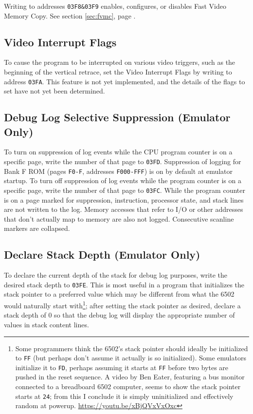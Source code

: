 \documentclass[12pt]{{memoir}}
\begin{document}
Writing to addresses \texttt{03F8\&03F9} enables, configures, or disables Fast Video Memory Copy. See section \ref{sec:fvmc}, page \pageref{sec:fvmc}.

\subsection{Video Interrupt Flags}

To cause the program to be interrupted on various video triggers, such as the beginning of the vertical retrace, set the Video Interrupt Flags by writing to address \texttt{03FA}. This feature is not yet implemented, and the details of the flags to set have not yet been determined.

\subsection{Debug Log Selective Suppression (Emulator Only)}

To turn on suppression of log events while the CPU program counter is on a specific page, write the number of that page to \texttt{03FD}. Suppression of logging for Bank F ROM (pages \texttt{F0-F}, addresses \texttt{F000-FFF}) is on by default at emulator startup. To turn off suppression of log events while the program counter is on a specific page, write the number of that page to \texttt{03FC}. While the program counter is on a page marked for suppression, instruction, processor state, and stack lines are not written to the log. Memory accesses that refer to I/O or other addresses that don't actually map to memory are also not logged. Consecutive scanline markers are collapsed.

\subsection{Declare Stack Depth (Emulator Only)}
To declare the current depth of the stack for debug log purposes, write the desired stack depth to \texttt{03FE}. This is most useful in a program that initializes the stack pointer to a preferred value which may be different from what the 6502 would naturally start with\footnote{Some programmers think the 6502's stack pointer should ideally be initialized to \texttt{FF} (but perhaps don't assume it actually is so initialized). Some emulators initialize it to \texttt{FD}, perhaps assuming it starts at \texttt{FF} before two bytes are pushed in the reset sequence. A video by Ben Eater, featuring a bus monitor connected to a breadboard 6502 computer, seems to show the stack pointer starts at \texttt{24}; from this I conclude it is simply uninitialized and effectively random at powerup. \url{https://youtu.be/xBjQVxVxOxc}}; after setting the stack pointer as desired, declare a stack depth of 0 so that the debug log will display the appropriate number of values in stack content lines.
\end{document}
